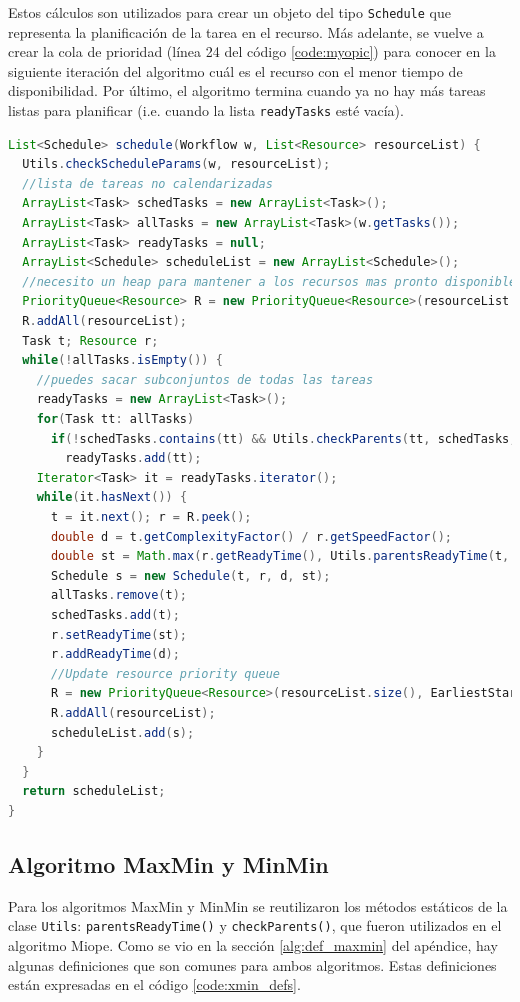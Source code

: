 Estos cálculos son utilizados para crear un objeto del tipo \texttt{Schedule} que representa la planificación de la tarea en el recurso. Más adelante, se vuelve a crear la cola de prioridad (línea 24 del código \ref{code:myopic}) para conocer en la siguiente iteración del algoritmo cuál es el recurso con el menor tiempo de disponibilidad. Por último, el algoritmo termina cuando ya no hay más tareas listas para planificar (i.e. cuando la lista \texttt{readyTasks} esté vacía).

\begin{lstlisting}[language=java,label={code:myopic},caption={Algoritmo Miope},float]
List<Schedule> schedule(Workflow w, List<Resource> resourceList) {
  Utils.checkScheduleParams(w, resourceList);
  //lista de tareas no calendarizadas
  ArrayList<Task> schedTasks = new ArrayList<Task>();
  ArrayList<Task> allTasks = new ArrayList<Task>(w.getTasks());
  ArrayList<Task> readyTasks = null;
  ArrayList<Schedule> scheduleList = new ArrayList<Schedule>();
  //necesito un heap para mantener a los recursos mas pronto disponibles
  PriorityQueue<Resource> R = new PriorityQueue<Resource>(resourceList.size(), EarliestStartTimeComparator.getComp());
  R.addAll(resourceList);
  Task t; Resource r;
  while(!allTasks.isEmpty()) {
    //puedes sacar subconjuntos de todas las tareas
    readyTasks = new ArrayList<Task>();
    for(Task tt: allTasks)
      if(!schedTasks.contains(tt) && Utils.checkParents(tt, schedTasks, w))
        readyTasks.add(tt);
    Iterator<Task> it = readyTasks.iterator();
    while(it.hasNext()) {
      t = it.next(); r = R.peek();
      double d = t.getComplexityFactor() / r.getSpeedFactor();
      double st = Math.max(r.getReadyTime(), Utils.parentsReadyTime(t, scheduleList, w));
      Schedule s = new Schedule(t, r, d, st);
      allTasks.remove(t);
      schedTasks.add(t);
      r.setReadyTime(st);
      r.addReadyTime(d);
      //Update resource priority queue
      R = new PriorityQueue<Resource>(resourceList.size(), EarliestStartTimeComparator.getComp());
      R.addAll(resourceList);
      scheduleList.add(s);
    }
  }
  return scheduleList;
}
\end{lstlisting}

\subsection{Algoritmo MaxMin y MinMin}
Para los algoritmos MaxMin y MinMin se reutilizaron los métodos estáticos de la clase \texttt{Utils}: \texttt{parentsReadyTime()} y \texttt{checkParents()}, que fueron utilizados en el algoritmo Miope. Como se vio en la sección \ref{alg:def_maxmin} del apéndice, hay algunas definiciones que son comunes para ambos algoritmos. Estas definiciones están expresadas en el código \ref{code:xmin_defs}.

